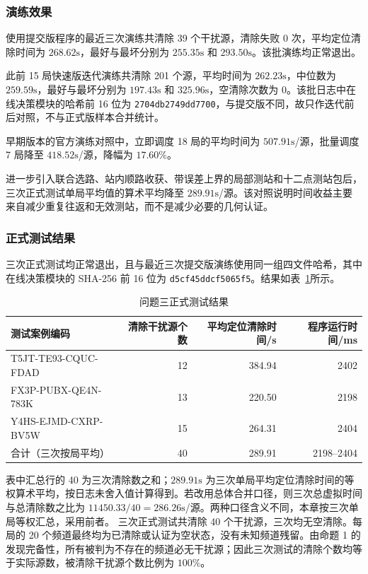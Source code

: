 \subsubsection{演练效果}

使用提交版程序的最近三次演练共清除 39 个干扰源，清除失败 0 次，平均定位清除时间为 $268.62\mathrm{s}$，最好与最坏分别为 $255.35\mathrm{s}$ 和 $293.50\mathrm{s}$。该批演练均正常退出。

此前 15 局快速版迭代演练共清除 201 个源，平均时间为 $262.23\mathrm{s}$，中位数为 $259.59\mathrm{s}$，最好与最坏分别为 $197.43\mathrm{s}$ 和 $325.96\mathrm{s}$，空清除次数为 0。该批日志中在线决策模块的哈希前 16 位为 \texttt{2704db2749dd7700}，与提交版不同，故只作迭代前后对照，不与正式版样本合并统计。

早期版本的官方演练对照中，立即调度 18 局的平均时间为 $507.91\mathrm{s}$/源，批量调度 7 局降至 $418.52\mathrm{s}$/源，降幅为 $17.60\%$。

进一步引入联合选路、站内顺路收获、带误差上界的局部测站和十二点测站包后，三次正式测试单局平均值的算术平均降至 $289.91\mathrm{s}$/源。该对照说明时间收益主要来自减少重复往返和无效测站，而不是减少必要的几何认证。

\subsubsection{正式测试结果}

三次正式测试均正常退出，且与最近三次提交版演练使用同一组四文件哈希，其中在线决策模块的 SHA-256 前 16 位为 \texttt{d5cf45ddcf5065f5}。结果如表~\ref{tab:q3_formal}所示。

\begin{table}[htbp]
\centering
\caption{问题三正式测试结果}
\label{tab:q3_formal}
\begin{tabular}{lrrr}
\toprule
测试案例编码 & 清除干扰源个数 & 平均定位清除时间/s & 程序运行时间/ms \\
\midrule
T5JT-TE93-CQUC-FDAD & 12 & 384.94 & 2402 \\
FX3P-PUBX-QE4N-783K & 13 & 220.50 & 2198 \\
Y4HS-EJMD-CXRP-BV5W & 15 & 264.31 & 2404 \\
\midrule
合计（三次按局平均） & 40 & 289.91 & 2198--2404 \\
\bottomrule
\end{tabular}
\end{table}

表中汇总行的 40 为三次清除数之和；$289.91\mathrm{s}$ 为三次单局平均定位清除时间的等权算术平均，按日志未舍入值计算得到。若改用总体合并口径，则三次总虚拟时间与总清除数之比为 $11450.33/40=286.26\mathrm{s}$/源。两种口径含义不同，本章按三次单局等权汇总，采用前者。
三次正式测试共清除 40 个干扰源，三次均无空清除。每局的 20 个频道最终均为已清除或认证为空状态，没有未知频道残留。由命题 1 的发现完备性，所有被判为不存在的频道必无干扰源；因此三次测试的清除个数均等于实际源数，被清除干扰源个数比例为 $100\%$。

